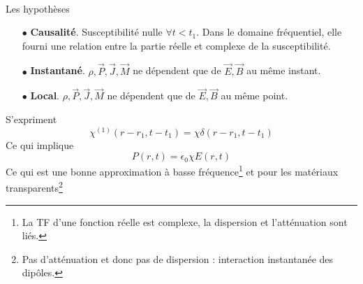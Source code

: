 \ \\

\newpage
Les hypothèses
\begin{itemize}
\item[$\bullet$] \textbf{Causalité}. Susceptibilité nulle $\forall t < t_1$. Dans le domaine fréquentiel, elle fourni une 
relation entre la partie réelle et complexe de la susceptibilité.
\item[$\bullet$] \textbf{Instantané}. $\rho,\vec P,\vec J, \vec M$ ne dépendent que de $\vec E, \vec B$ au même instant.
\item[$\bullet$] \textbf{Local}. $\rho,\vec P,\vec J, \vec M$ ne dépendent que de $\vec E, \vec B$ au même point.
\end{itemize}
S'expriment
\begin{equation}
\chi^{(1)}(r-r_1,t-t_1)= \chi\delta(r-r_1,t-t_1)
\end{equation}
Ce qui implique
\begin{equation}
P(r,t) = \epsilon_0\chi E(r,t)
\end{equation}
Ce qui est une bonne approximation à basse fréquence\footnote{La TF d'une fonction réelle est complexe, la 
dispersion et l'atténuation sont liés.} et pour les matériaux transparents\footnote{Pas d'atténuation et donc 
pas de dispersion : interaction instantanée des dipôles.}


